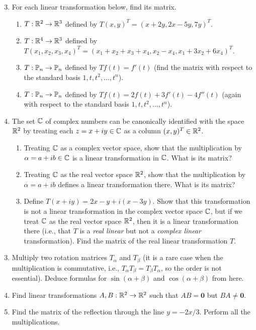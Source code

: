 \documentclass[../psets.tex]{subfiles}
\begin{document}
\begin{enumerate}[label={\textbf{3.\arabic*.}}]
    \setcounter{enumi}{2}
    \item For each linear transformation below, find its matrix.
    \begin{enumerate}
        \item $T:\mathbb{R}^2\to\mathbb{R}^3$ defined by $T(x,y)^T=(x+2y,2x-5y,7y)^T$.
        \item $T:\mathbb{R}^4\to\mathbb{R}^3$ defined by $T(x_1,x_2,x_3,x_4)^T=(x_1+x_2+x_3+x_4,x_2-x_4,x_1+3x_2+6x_4)^T$.
        \item $T:\mathbb{P}_n\to\mathbb{P}_n$ defined by $Tf(t)=f'(t)$ (find the matrix with respect to the standard basis $1,t,t^2,\dots,t^n$).
        \item $T:\mathbb{P}_n\to\mathbb{P}_n$ defined by $Tf(t)=2f(t)+3f'(t)-4f''(t)$ (again with respect to the standard basis $1,t,t^2,\dots,t^n$).
    \end{enumerate}
    \setcounter{enumi}{5}
    \item The set $\mathbb{C}$ of complex numbers can be canonically identified with the space $\mathbb{R}^2$ by treating each $z=x+iy\in\mathbb{C}$ as a column $(x,y)^T\in\mathbb{R}^2$.
    \begin{enumerate}
        \item Treating $\mathbb{C}$ as a complex vector space, show that the multiplication by $\alpha=a+ib\in\mathbb{C}$ is a linear transformation in $\mathbb{C}$. What is its matrix?
        \item Treating $\mathbb{C}$ as the real vector space $\mathbb{R}^2$, show that the multiplication by $\alpha=a+ib$ defines a linear transformation there. What is its matrix?
        \item Define $T(x+iy)=2x-y+i(x-3y)$. Show that this transformation is not a linear transformation in the complex vector space $\mathbb{C}$, but if we treat $\mathbb{C}$ as the real vector space $\mathbb{R}^2$, then it is a linear transformation there (i.e., that $T$ is a \emph{real linear} but not a \emph{complex linear} transformation). Find the matrix of the real linear transformation $T$.
    \end{enumerate}
\end{enumerate}

\begin{enumerate}[label={\textbf{5.\arabic*.}}]
    \setcounter{enumi}{2}
    \item Multiply two rotation matrices $T_\alpha$ and $T_\beta$ (it is a rare case when the multiplication is commutative, i.e., $T_\alpha T_\beta=T_\beta T_\alpha$, so the order is not essential). Deduce formulas for $\sin(\alpha+\beta)$ and $\cos(\alpha+\beta)$ from here.
    \setcounter{enumi}{4}
    \item Find linear transformations $A,B:\mathbb{R}^2\to\mathbb{R}^2$ such that $AB=\bm{0}$ but $BA\neq\bm{0}$.
    \setcounter{enumi}{7}
    \item Find the matrix of the reflection through the line $y=-2x/3$. Perform all the multiplications.
\end{enumerate}
\end{document}
